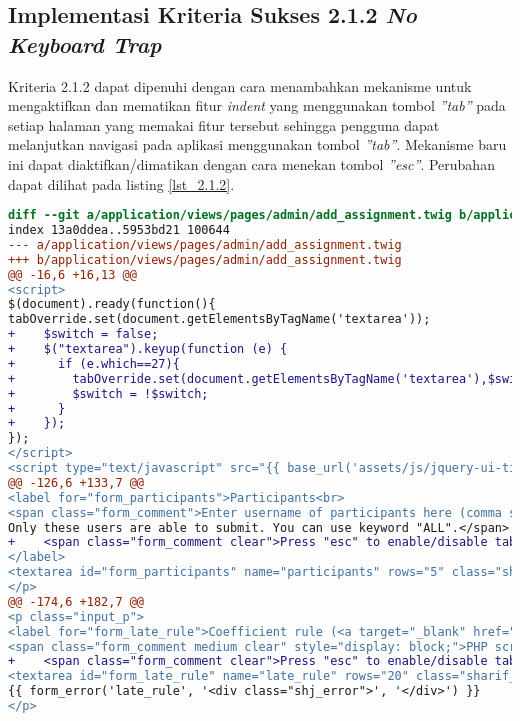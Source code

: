 \subsection{Implementasi Kriteria Sukses 2.1.2 \textit{No \textit{Keyboard} Trap}}
\label{subsec:implementasi_A_2.1.2}

Kriteria 2.1.2 dapat dipenuhi dengan cara menambahkan mekanisme untuk mengaktifkan dan mematikan fitur \textit{indent} yang menggunakan tombol \textit{''tab''} pada setiap halaman yang memakai fitur tersebut sehingga pengguna dapat melanjutkan navigasi pada aplikasi menggunakan tombol \textit{''tab''}. Mekanisme baru ini dapat diaktifkan/dimatikan dengan cara menekan tombol \textit{''esc''}. Perubahan dapat dilihat pada listing \ref{lst_2.1.2}.

\begin{lstlisting}[language=diff, caption=Perubahan untuk mematuhi kriteria 2.1.2, label=lst_2.1.2, basicstyle=\ttfamily, frame=single,
columns=fullflexible, keepspaces=true, breaklines=true]
diff --git a/application/views/pages/admin/add_assignment.twig b/application/views/pages/admin/add_assignment.twig
index 13a0ddea..5953bd21 100644
--- a/application/views/pages/admin/add_assignment.twig
+++ b/application/views/pages/admin/add_assignment.twig
@@ -16,6 +16,13 @@
<script>
$(document).ready(function(){
tabOverride.set(document.getElementsByTagName('textarea'));
+    $switch = false;
+    $("textarea").keyup(function (e) {
+      if (e.which==27){
+        tabOverride.set(document.getElementsByTagName('textarea'),$switch);
+        $switch = !$switch;
+      }
+    });
});
</script>
<script type="text/javascript" src="{{ base_url('assets/js/jquery-ui-timepicker-addon.js') }}"></script>
@@ -126,6 +133,7 @@
<label for="form_participants">Participants<br>
<span class="form_comment">Enter username of participants here (comma separated).
Only these users are able to submit. You can use keyword "ALL".</span>
+    <span class="form_comment clear">Press "esc" to enable/disable tabindent</span>
</label>
<textarea id="form_participants" name="participants" rows="5" class="sharif_input medium">{{ edit ? edit_assignment.participants : set_value('participants', 'ALL') }}</textarea>
</p>
@@ -174,6 +182,7 @@
<p class="input_p">
<label for="form_late_rule">Coefficient rule (<a target="_blank" href="https://github.com/ifunpar/Sharif-Judge/blob/docs/v1.4/add_assignment.md#coefficient-rule">?</a>)</label><br>
<span class="form_comment medium clear" style="display: block;">PHP script without &lt;?php ?&gt; tags</span>
+    <span class="form_comment clear">Press "esc" to enable/disable tabindent</span><br>
<textarea id="form_late_rule" name="late_rule" rows="20" class="sharif_input add_text">{{ edit ? edit_assignment.late_rule : set_value('late_rule', default_late_rule) }}</textarea>
{{ form_error('late_rule', '<div class="shj_error">', '</div>') }}
</p>


\end{lstlisting}
